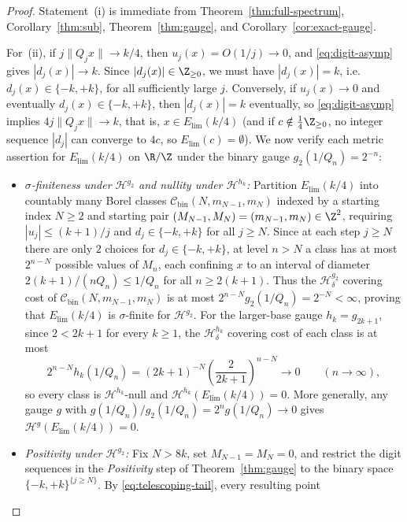 \begin{proof}
Statement~(i) is immediate from Theorem~\ref{thm:full-spectrum},
Corollary~\ref{thm:sub}, Theorem~\ref{thm:gauge}, and
Corollary~\ref{cor:exact-gauge}.

For~(ii), if $j\|Q_jx\|\to k/4$, then $u_j(x)=O(1/j)\to0$, and
\eqref{eq:digit-asymp} gives $|d_j(x)|\to k$. Since $|d_j(x)|\in\Z_{\ge0}$, we
must have $|d_j(x)|=k$, i.e.\ $d_j(x)\in\{-k,+k\}$, for all sufficiently large
$j$. Conversely, if $u_j(x)\to0$ and eventually $d_j(x)\in\{-k,+k\}$, then
$|d_j(x)|=k$ eventually, so \eqref{eq:digit-asymp} implies $4j\|Q_jx\|\to k$,
that is, $x\in E_{\mathrm{lim}}(k/4)$ (and if $c\notin\frac14\Z_{\ge0}$, no
integer sequence $|d_j|$ can converge to $4c$, so $E_{\mathrm{lim}}(c)=\emptyset$).
We now verify each metric assertion for $E_{\mathrm{lim}}(k/4)$ on $\R/\Z$ under
the binary gauge $g_2(1/Q_n)=2^{-n}$:
\begin{itemize}[leftmargin=1.8em]
\item \emph{$\sigma$-finiteness under $\mathcal H^{g_2}$ and nullity under $\mathcal H^{h_k}$:}
Partition $E_{\mathrm{lim}}(k/4)$ into countably many Borel classes
$\mathcal C_{\mathrm{bin}}(N,m_{N-1},m_N)$ indexed by a starting index $N\ge2$
and starting pair $(M_{N-1},M_N)=(m_{N-1},m_N)\in\Z^2$, requiring
$|u_j|\le(k+1)/j$ and $d_j\in\{-k,+k\}$ for all $j\ge N$. Since at each step
$j\ge N$ there are only $2$ choices for $d_j\in\{-k,+k\}$, at level $n>N$ a
class has at most $2^{n-N}$ possible values of $M_n$, each confining $x$ to an
interval of diameter $2(k+1)/(nQ_n)\le1/Q_n$ for all $n\ge2(k+1)$. Thus the
$\mathcal H_\delta^{g_2}$ covering cost of $\mathcal C_{\mathrm{bin}}(N,m_{N-1},m_N)$
is at most $2^{n-N}g_2(1/Q_n)=2^{-N}<\infty$, proving that
$E_{\mathrm{lim}}(k/4)$ is $\sigma$-finite for $\mathcal H^{g_2}$. For the
larger-base gauge $h_k=g_{2k+1}$, since $2<2k+1$ for every $k\ge1$, the
$\mathcal H_\delta^{h_k}$ covering cost of each class is at most
\[
2^{n-N}h_k(1/Q_n)=(2k+1)^{-N}\left(\frac{2}{2k+1}\right)^{n-N}\longrightarrow0
\qquad(n\to\infty),
\]
so every class is $\mathcal H^{h_k}$-null and
$\mathcal H^{h_k}(E_{\mathrm{lim}}(k/4))=0$. More generally, any gauge $g$ with
$g(1/Q_n)/g_2(1/Q_n)=2^ng(1/Q_n)\to0$ gives
$\mathcal H^g(E_{\mathrm{lim}}(k/4))=0$.
\item \emph{Positivity under $\mathcal H^{g_2}$:}
Fix $N>8k$, set $M_{N-1}=M_N=0$, and restrict the digit sequences in the
\emph{Positivity} step of Theorem~\ref{thm:gauge} to the binary space
$\{-k,+k\}^{\{j\ge N\}}$. By \eqref{eq:telescoping-tail}, every resulting point

\end{itemize}
\end{proof}
